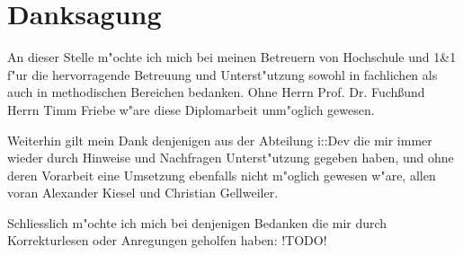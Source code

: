 \chapter*{Danksagung}

An dieser Stelle m"ochte ich mich bei meinen Betreuern von Hochschule und 1\&1 f"ur die hervorragende
Betreuung und Unterst"utzung sowohl in fachlichen als auch in methodischen Bereichen bedanken.
Ohne Herrn Prof. Dr. Fuch\ss  und Herrn Timm Friebe w"are diese Diplomarbeit unm"oglich gewesen.

Weiterhin gilt mein Dank denjenigen aus der Abteilung i::Dev die mir immer wieder durch Hinweise und 
Nachfragen Unterst"utzung gegeben haben, und ohne deren Vorarbeit eine Umsetzung ebenfalls nicht
m"oglich gewesen w"are, allen voran Alexander Kiesel und Christian Gellweiler.

Schliesslich m"ochte ich mich bei denjenigen Bedanken die mir durch Korrekturlesen oder Anregungen geholfen
haben: !TODO!


